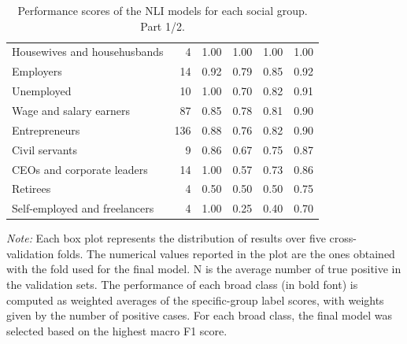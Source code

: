 \begin{table}[htb]
\begin{tabular}{l r r r r r}
\quad Housewives and househusbands & 4 & 1.00 & 1.00 & 1.00 & 1.00 \\
\quad Employers & 14 & 0.92 & 0.79 & 0.85 & 0.92 \\
\quad Unemployed & 10 & 1.00 & 0.70 & 0.82 & 0.91 \\
\quad Wage and salary earners & 87 & 0.85 & 0.78 & 0.81 & 0.90 \\
\quad Entrepreneurs & 136 & 0.88 & 0.76 & 0.82 & 0.90 \\
\quad Civil servants & 9 & 0.86 & 0.67 & 0.75 & 0.87 \\
\quad CEOs and corporate leaders & 14 & 1.00 & 0.57 & 0.73 & 0.86 \\
\quad Retirees & 4 & 0.50 & 0.50 & 0.50 & 0.75 \\
\quad Self-employed and freelancers & 4 & 1.00 & 0.25 & 0.40 & 0.70 \\
\bottomrule
\end{tabular}
\par\vspace{0.15cm}
\begin{minipage}{0.9\linewidth}
\footnotesize
\textit{Note:} Each box plot represents the distribution of results over five cross-validation folds. The numerical values reported in the plot are the ones obtained with the fold used for the final model. N is the average number of true positive in the validation sets. The performance of each broad class (in bold font) is computed as weighted averages of the specific-group label scores, with weights given by the number of positive cases. For each broad class, the final model was selected based on the highest macro F1 score.
\end{minipage}
\caption{Performance scores of the NLI models for each social group. Part 1/2.}
\label{tab:step2_best_fold_metrics_1}
\end{table}